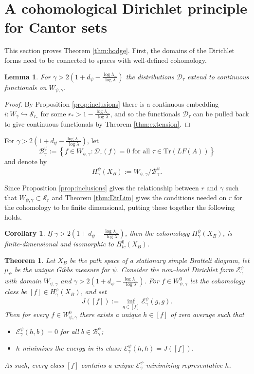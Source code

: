 \documentclass[12pt]{amsart}
\theoremstyle{plain}
\newtheorem{theorem}{Theorem}[section]
\newtheorem{corollary}{Corollary}[section]
\newtheorem{lemma}{Lemma}[section]
\theoremstyle{definition}
\begin{document}
\section{A cohomological Dirichlet principle for Cantor sets}
\label{sec:Hodge}
This section proves Theorem \ref{thm:hodge}. First, the domains of the Dirichlet forms need to be connected to spaces with well-defined cohomology.
\begin{lemma}
\label{lem:extend}
     For $\gamma>2(1+d_\psi - \frac{\log\lambda_-}{\log\lambda})$ the distributions $\mathcal{D}_\tau$ extend to continuous functionals on $W_{\psi,\gamma}$.
 \end{lemma}
 \begin{proof}
 By Proposition \ref{prop:inclusions} there is a continuous embedding $i:W_\gamma \hookrightarrow \mathcal{S}_{r_*}$  for some $r_* > 1-\frac{\log\lambda_-}{\log\lambda}$, and so the functionals $\mathcal{D}_\tau$ can be pulled back to give continuous functionals by Theorem \ref{thm:extension}.
 \end{proof}

For $\gamma> 2(1+d_\psi - \frac{\log\lambda_-}{\log\lambda})$, let
$$\mathcal{B}_\gamma^\psi := \left\{ f\in W_{\psi,\gamma} : \mathcal{D}_\tau(f) = 0 \mbox{ for all }\tau\in \mathrm{Tr}(LF(A))  \right\}$$
and denote by
$$H^\psi _\gamma(X_B):= W_{\psi,\gamma} /\mathcal{B}^\psi_\gamma .$$

Since Proposition \ref{prop:inclusions} gives the relationship between $r$ and $\gamma$ such that $W_{\psi,\gamma} \subset \mathcal{S}_r$ and Theorem \ref{thm:DirLim} gives the conditions needed on $r$ for the cohomology to be finite dimensional, putting these together the following holds.
\begin{corollary}
If $\gamma> 2(1+d_\psi - \frac{\log\lambda_-}{\log\lambda}) $, then the cohomology $H_\gamma^\psi (X_B)$, is finite-dimensional and isomorphic to $H_{lc}^0(X_B)$.
\end{corollary}

\begin{theorem}
\label{thm:harmonic}
Let $X_B$ be the path space of a stationary simple Bratteli diagram, let $\mu_\psi$ be the unique Gibbs measure for $\psi$. Consider the non–local Dirichlet form $\mathcal{E}^\psi_\gamma$ with domain $W_{\psi,\gamma}$ and $\gamma>2(1+d_\psi - \frac{\log\lambda_-}{\log\lambda})$. For $f\in W_{\psi,\gamma}^0$ let the cohomology class be $[f]\in H_\gamma^\psi(X_B)$, and set
$$J([f]):=\inf_{g\in[f]}\mathcal{E}^\psi_\gamma(g,g).$$
Then for every $f\in W_{\psi,\gamma}^0$ there exists a unique $h\in [f]$ of zero average such that
\begin{itemize}
\item $\mathcal{E}^\psi_\gamma(h,b)=0$ for all $b\in\mathcal{B}^\psi_\gamma$;
\item $h$ minimizes the energy in its class: $\mathcal{E}^\psi_\gamma(h,h)=J([f])$.
\end{itemize}
As such, every class $[f]$ contains a unique $\mathcal{E}_\gamma^{\psi}$-minimizing representative $h$.
\end{theorem}
\end{document}
